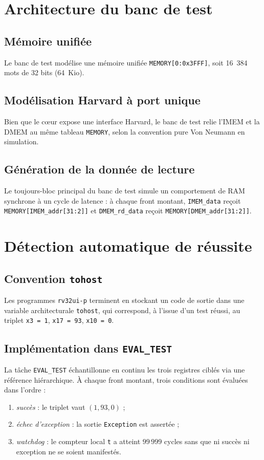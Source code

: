 \documentclass[11pt,a4paper,oneside]{report}
\begin{document}
\section{Architecture du banc de test}
\subsection{Mémoire unifiée}
Le banc de test modélise une mémoire unifiée
\texttt{MEMORY[0:0x3FFF]}, soit 16~384 mots de 32 bits (64~Kio).

\subsection{Modélisation Harvard à port unique}
Bien que le c\oe{}ur expose une interface Harvard, le banc de
test relie l'IMEM et la DMEM au même tableau \texttt{MEMORY},
selon la convention \og{}pure Von Neumann en simulation\fg{}.

\subsection{Génération de la donnée de lecture}
Le toujours-bloc principal du banc de test simule un comportement
de RAM synchrone à un cycle de latence : à chaque front montant,
\texttt{IMEM\_data} reçoit \texttt{MEMORY[IMEM\_addr[31:2]]} et
\texttt{DMEM\_rd\_data} reçoit
\texttt{MEMORY[DMEM\_addr[31:2]]}.

\section{Détection automatique de réussite}
\subsection{Convention \texttt{tohost}}
Les programmes \texttt{rv32ui-p} terminent en stockant un code
de sortie dans une variable architecturale \texttt{tohost}, qui
correspond, à l'issue d'un test réussi, au triplet
\texttt{x3 = 1}, \texttt{x17 = 93}, \texttt{x10 = 0}.

\subsection{Implémentation dans \texttt{EVAL\_TEST}}
La tâche \texttt{EVAL\_TEST} échantillonne en continu les trois
registres ciblés via une référence hiérarchique. À chaque front
montant, trois conditions sont évaluées dans l'ordre :
\begin{enumerate}
  \item \emph{succès} : le triplet vaut $(1,93,0)$ ;
  \item \emph{échec d'exception} : la sortie
        \texttt{Exception} est assertée ;
  \item \emph{watchdog} : le compteur local \texttt{t} a
        atteint $99\,999$ cycles sans que ni succès ni
        exception ne se soient manifestés.
\end{enumerate}
\end{document}
